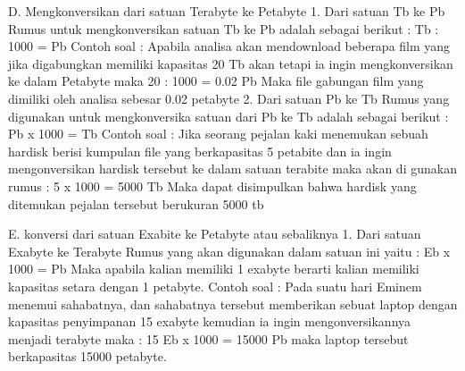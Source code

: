 D. Mengkonversikan dari satuan Terabyte ke Petabyte
1.	Dari satuan Tb ke Pb
Rumus untuk mengkonversikan satuan Tb ke Pb adalah sebagai berikut :
Tb : 1000 = Pb
Contoh soal :
Apabila analisa akan mendownload beberapa film yang jika digabungkan memiliki kapasitas 20 Tb akan tetapi ia ingin mengkonversikan ke dalam Petabyte maka 
20 : 1000 = 0.02 Pb
Maka file gabungan film yang dimiliki oleh analisa sebesar 0.02 petabyte
2. Dari satuan Pb ke Tb
Rumus yang digunakan untuk mengkonversika satuan dari Pb ke Tb adalah sebagai berikut :
Pb x 1000 = Tb
Contoh soal :
Jika seorang pejalan kaki menemukan sebuah hardisk berisi kumpulan file yang berkapasitas 5 petabite dan ia ingin mengonversikan hardisk tersebut ke dalam satuan terabite maka akan di gunakan rumus :
5 x 1000 = 5000 Tb
Maka dapat disimpulkan bahwa hardisk yang ditemukan pejalan tersebut berukuran 5000 tb

E. konversi dari satuan Exabite ke Petabyte atau sebaliknya
1. Dari satuan Exabyte ke Terabyte
Rumus yang akan digunakan dalam satuan ini yaitu :
Eb x 1000 = Pb
Maka apabila kalian memiliki 1 exabyte berarti kalian memiliki kapasitas setara dengan 1 petabyte.
Contoh soal :
Pada suatu hari Eminem menemui sahabatnya, dan sahabatnya tersebut memberikan sebuat laptop dengan kapasitas penyimpanan 15 exabyte kemudian ia ingin mengonversikannya menjadi terabyte maka :
15 Eb x 1000 = 15000 Pb maka laptop tersebut berkapasitas 15000 petabyte.

